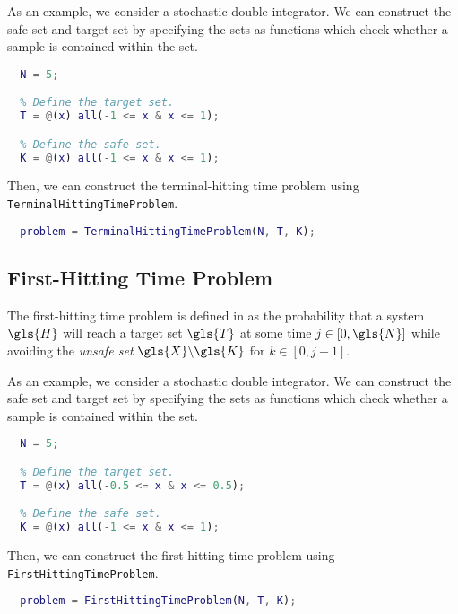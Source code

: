 \documentclass[11pt]{article}
\begin{document}
As an example, we consider a stochastic double integrator.
We can construct the safe set and target set by specifying the sets as functions which check whether a sample is contained within the set.
\begin{lstlisting}[language=Matlab]
  % Define the time horizon.
  N = 5;

  % Define the target set.
  T = @(x) all(-1 <= x & x <= 1);

  % Define the safe set.
  K = @(x) all(-1 <= x & x <= 1);
\end{lstlisting}
Then, we can construct the terminal-hitting time problem using \verb|TerminalHittingTimeProblem|.
\begin{lstlisting}[language=Matlab, firstnumber=last]
  % Define the terminal-hitting time problem.
  problem = TerminalHittingTimeProblem(N, T, K);
\end{lstlisting}


\subsection{First-Hitting Time Problem}
\label{section: first-hitting time problem}

The first-hitting time problem is defined in \cite{summers} as the probability that a system $\gls{H}$ will reach a target set $\gls{T}$ at some time $j \in [0, \gls{N}]$ while avoiding the \emph{unsafe set} $\gls{X}\backslash\gls{K}$ for $k \in [0, j-1]$.

As an example, we consider a stochastic double integrator.
We can construct the safe set and target set by specifying the sets as functions which check whether a sample is contained within the set.
\begin{lstlisting}[language=Matlab]
  % Define the time horizon.
  N = 5;

  % Define the target set.
  T = @(x) all(-0.5 <= x & x <= 0.5);

  % Define the safe set.
  K = @(x) all(-1 <= x & x <= 1);
\end{lstlisting}
Then, we can construct the first-hitting time problem using \verb|FirstHittingTimeProblem|.
\begin{lstlisting}[language=Matlab, firstnumber=last]
  % Define the first-hitting time problem.
  problem = FirstHittingTimeProblem(N, T, K);
\end{lstlisting}
\end{document}
